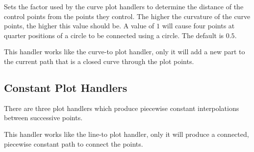 \begin{command}{\pgfsetplottension{}}
  Sets the factor used by the curve plot handlers to determine the
  distance of the control points from the points they control. The
  higher the curvature of the curve points, the higher this value
  should be. A value of $1$ will cause four points at quarter
  positions of a circle to be connected using a circle. The default is
  $0.5$. 

\begin{codeexample}[]
\end{codeexample}
\end{command}


\begin{command}{\pgfplothandlerclosedcurve}
  This handler works like the curve-to plot handler, only it will
  add a new part to the current path that is a closed curve through
  the plot points.
\begin{codeexample}[]
\end{codeexample}
\end{command}

\subsection{Constant Plot Handlers}
There are three plot handlers which produce piecewise constant interpolations between successive points.

\begin{command}{\pgfplothandlerconstantlineto}
  This handler works like the line-to plot handler, only it will
  produce a connected, piecewise constant path to connect the points.
\begin{codeexample}[]
\end{codeexample}
\end{command}

